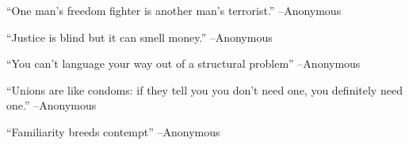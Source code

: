 \documentclass{article}%
\begin{document}
\linebreak%
\vspace{1mm}%
\begin{minipage}{\textwidth}%
\flushleft%
“One man's freedom fighter is another man's terrorist.”%
\linebreak%
\vspace{1mm}%
–Anonymous%
\linebreak%
\vspace{1mm}%
\end{minipage}%
\linebreak%
\vspace{1mm}%
\begin{minipage}{\textwidth}%
\flushleft%
“Justice is blind but it can smell money.”%
\linebreak%
\vspace{1mm}%
–Anonymous%
\linebreak%
\vspace{1mm}%
\end{minipage}%
\linebreak%
\vspace{1mm}%
\begin{minipage}{\textwidth}%
\flushleft%
“You can't language your way out of a structural problem”%
\linebreak%
\vspace{1mm}%
–Anonymous%
\linebreak%
\vspace{1mm}%
\end{minipage}%
\linebreak%
\vspace{1mm}%
\begin{minipage}{\textwidth}%
\flushleft%
“Unions are like condoms: if they tell you you don't need one, you definitely need one.”%
\linebreak%
\vspace{1mm}%
–Anonymous%
\linebreak%
\vspace{1mm}%
\end{minipage}%
\linebreak%
\vspace{1mm}%
\begin{minipage}{\textwidth}%
\flushleft%
“Familiarity breeds contempt”%
\linebreak%
\vspace{1mm}%
–Anonymous%
\linebreak%
\vspace{1mm}%
\end{minipage}%
\end{document}
